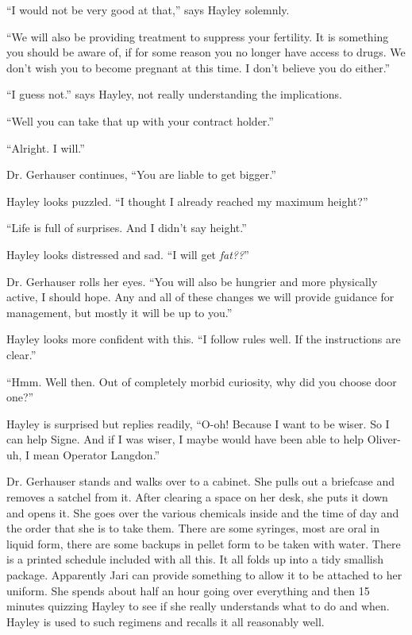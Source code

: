 ``I would not be very good at that,'' says Hayley solemnly.

``We will also be providing treatment to suppress your fertility.  It is something you should be aware of, if for some reason you no longer have access to drugs.  We don't wish you to become pregnant at this time.  I don't believe you do either.''

``I guess not.'' says Hayley, not really understanding the implications.

``Well you can take that up with your contract holder.''

``Alright.  I will.''

Dr. Gerhauser continues, ``You are liable to get bigger.''

Hayley looks puzzled.  ``I thought I already reached my maximum height?''

``Life is full of surprises.  And I didn't say height.''

Hayley looks distressed and sad.  ``I will get \textit{fat??}''

Dr. Gerhauser rolls her eyes.  ``You will also be hungrier and more physically active, I should hope.  Any and all of these changes we will provide guidance for management, but mostly it will be up to you.''

Hayley looks more confident with this.  ``I follow rules well.  If the instructions are clear.''

``Hmm.  Well then.  Out of completely morbid curiosity, why did you choose door one?''

Hayley is surprised but replies readily, ``O-oh!  Because I want to be wiser.  So I can help Signe.  And if I was wiser, I maybe would have been able to help Oliver- uh, I mean Operator Langdon.''



Dr. Gerhauser stands and walks over to a cabinet.  She pulls out a briefcase and removes a satchel from it. After clearing a space on her desk, she puts it down and opens it.  She goes over the various chemicals inside and the time of day and the order that she is to take them.  There are some syringes, most are oral in liquid form, there are some backups in pellet form to be taken with water.  There is a printed schedule included with all this.  It all folds up into a tidy smallish package.  Apparently Jari can provide something to allow it to be attached to her uniform.  She spends about half an hour going over everything and then 15 minutes quizzing Hayley to see if she really understands what to do and when.  Hayley is used to such regimens and recalls it all reasonably well.



